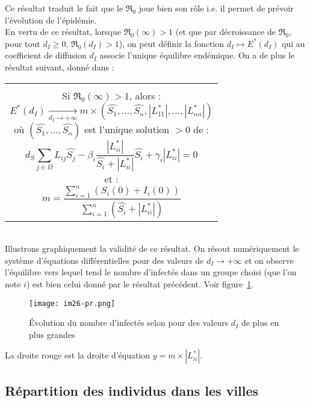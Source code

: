 \documentclass[a4paper,10.9pt]{article}
\newcommand{\R}{\mathfrak{R}_0}
\begin{document}
Ce résultat traduit le fait que le $\R$ joue bien son rôle i.e. il permet de prévoir l'évolution de l'épidémie. \\

En vertu de ce résultat, lorsque $\R (\infty) > 1$ (et que par décroissance de $\R$, pour tout $d_I\geq 0$, $\R(d_I) > 1$), on peut définir la fonction $d_I \mapsto E^*(d_I)$ qui au coefficient de diffusion $d_I$ associe l'unique équilibre endémique. On a de plus le résultat suivant, donné dans \cite{GaoDong} : \\

\begin{tabular}{|c}
\begin{minipage}{\textwidth}
\textbf{Proposition} \\
Si $\R(\infty) > 1$, alors :
$$E^*(d_I) \underset{d_I \to +\infty}{\longrightarrow} m \times (\hat{S_1},...,\hat{S_n},|L_{11}^*|,...,|L_{nn}^*|)$$
où $(\hat{S_1},...,\hat{S_n})$ est l'unique solution $>0$ de :
$$d_S \sum_{j \in \Omega} L_{ij} \hat{S_j} - \beta_i \frac{|L_{ii}^*|}{\hat{S_i} + |L_{ii}^*|} \hat{S_i} + \gamma_i |L_{ii}^*| = 0$$
et :
$$m=\frac{\sum_{i=1}^n (S_i(0)+I_i(0))}{\sum_{i=1}^n (\hat{S_i} + |L_{ii}^*|)}$$
\end{minipage}
\end{tabular} \\

Illustrons graphiquement la validité de ce résultat. On résout numériquement le système d'équations différentielles pour des valeurs de $d_I \longrightarrow + \infty$ et on observe l'équilibre vers lequel tend le nombre d'infectés dans un groupe choisi (que l'on note $i$) est bien celui donné par le résultat précédent. Voir figure~\ref{fig:nb_inf_di}. \\

\begin{figure}[h!]
  \centering
  \texttt{[image: im26-pr.png]} %
  \caption{Évolution du nombre d'infectés selon pour des valeurs $d_I$ de plus en plus grandes}
  \label{fig:nb_inf_di}
\end{figure}

La droite rouge est la droite d'équation $y=m \times |L_{ii}^*|$. \\

\subsection{Répartition des individus dans les villes}
\end{document}
